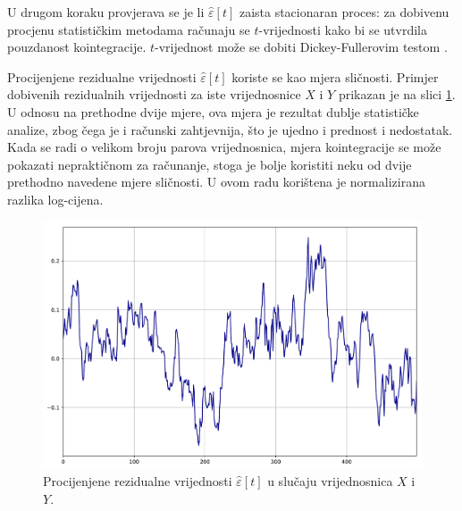 \documentclass[lmodern, utf8, diplomski, numeric]{fer}
\newcommand{\q}{\left}
\newcommand{\w}{\right}
\begin{document}
  U drugom koraku provjerava se je li $\hat{\varepsilon}\q[t\w]$ zaista stacionaran proces: za dobivenu procjenu statističkim metodama računaju se $t$-vrijednosti kako bi se utvrdila pouzdanost kointegracije.
  $t$-vrijednost može se dobiti Dickey-Fullerovim testom \citep{dickey-fuller}.
  
  Procijenjene rezidualne vrijednosti $\hat{\varepsilon}\q[t\w]$ koriste se kao mjera sličnosti.
  Primjer dobivenih rezidualnih vrijednosti za iste vrijednosnice $X$ i $Y$ prikazan je na slici \ref{fig:residual}.
  U odnosu na prethodne dvije mjere, ova mjera je rezultat dublje statističke analize, zbog čega je i računski zahtjevnija, što je ujedno i prednost i nedostatak.
  Kada se radi o velikom broju parova vrijednosnica, mjera kointegracije se može pokazati nepraktičnom za računanje, stoga je bolje koristiti neku od dvije prethodno navedene mjere sličnosti.
  U ovom radu korištena je normalizirana razlika log-cijena.
  
  \begin{figure}[H]
    \centering
    \includegraphics[width=1.0\linewidth]{graphics/residual.pdf}
    \caption{
      Procijenjene rezidualne vrijednosti $\hat{\varepsilon}\q[t\w]$ u slučaju vrijednosnica $X$ i $Y$.}
    \label{fig:residual}
  \end{figure}
  
\end{document}
